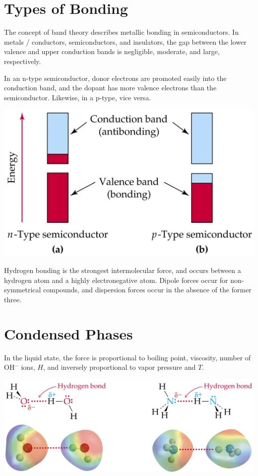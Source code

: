 \documentclass{tufte-book}
\begin{document}
\section{Types of Bonding}
The concept of band theory describes metallic bonding in semiconductors. In metals / conductors, semiconductors, and insulators, the gap between the lower valence and upper conduction bands is negligible, moderate, and large, respectively.

\bigskip
In an n-type semiconductor, donor electrons are promoted easily into the conduction band, and the dopant has more valence electrons than the semiconductor. Likewise, in a p-type, vice versa.

\begin{marginfigure}
\begin{center}
  \includegraphics[width=\textwidth]{semi}
\end{center}
\end{marginfigure}

\bigskip
Hydrogen bonding is the strongest intermolecular force, and occurs between a hydrogen atom and a highly electronegative atom. Dipole forces occur for non-symmetrical compounds, and dispersion forces occur in the absence of the former three.

\section{Condensed Phases}
In the liquid state, the force is proportional to boiling point, viscosity, number of OH$^-$ ions, $H$, and inversely proportional to vapor pressure and $T$.
%
\begin{marginfigure}[0mm]
\begin{center}
  \includegraphics[width=\textwidth]{hydrogen}
\end{center}
\end{marginfigure}
\end{document}

